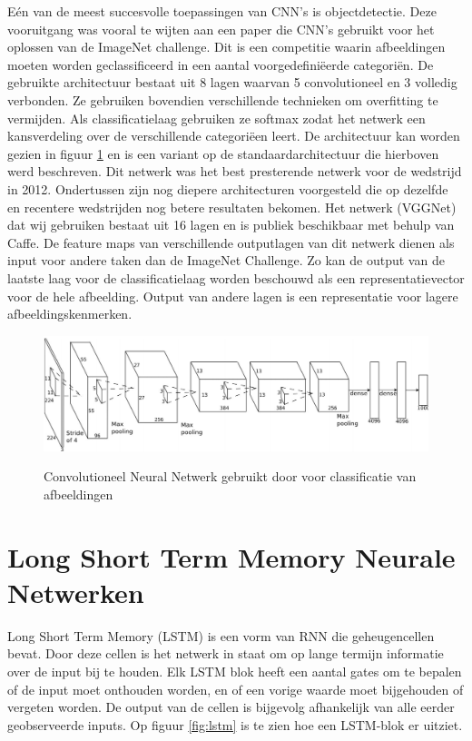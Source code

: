 E\'en van de meest succesvolle toepassingen van CNN's is objectdetectie. Deze vooruitgang was vooral te wijten aan een paper\cite{Krizhevsky2012a} die CNN's gebruikt voor het oplossen van de ImageNet challenge.\cite{ILSVRC15}
Dit is een competitie waarin afbeeldingen moeten worden geclassificeerd in een aantal voorgedefini\"eerde categori\"en. De gebruikte architectuur bestaat uit 8 lagen waarvan 5 convolutioneel en 3 volledig verbonden. Ze gebruiken bovendien verschillende technieken om overfitting te vermijden. Als classificatielaag gebruiken ze softmax zodat het netwerk een kansverdeling over de verschillende categori\"een leert. De architectuur kan worden gezien in figuur \ref{fig:AlexNet} en  is een variant op de standaardarchitectuur die hierboven werd beschreven. Dit netwerk was het best presterende netwerk voor de wedstrijd in 2012. Ondertussen zijn nog diepere architecturen voorgesteld die op dezelfde en recentere wedstrijden nog betere resultaten bekomen. Het netwerk (VGGNet)\cite{Arge2015} dat wij gebruiken bestaat uit 16 lagen en is publiek beschikbaar met behulp van Caffe\cite{Jia2014}. De feature maps van verschillende outputlagen van dit netwerk dienen als input voor andere taken dan de ImageNet Challenge. Zo kan de output van de laatste laag voor de classificatielaag worden beschouwd als een representatievector voor de hele afbeelding. Output van andere lagen is een representatie voor lagere  afbeeldingskenmerken. 
\begin{figure}[tb]
	\centering
	\includegraphics[width=\linewidth]{Images/cnn.PNG}
	\label{fig:AlexNet}
	\caption{Convolutioneel Neural Netwerk gebruikt door \cite{Krizhevsky2012a} voor classificatie van afbeeldingen}
\end{figure}


\section{Long Short Term Memory Neurale Netwerken}
Long Short Term Memory (LSTM) is een vorm van RNN die geheugencellen bevat. Door deze cellen is het netwerk in staat om op lange termijn informatie over de input bij te houden. Elk LSTM blok heeft een aantal gates om te bepalen of de input moet onthouden worden, en of een vorige waarde moet bijgehouden of vergeten worden. De output van de cellen is bijgevolg afhankelijk van alle eerder geobserveerde inputs. Op figuur \ref{fig:lstm} is te zien hoe een LSTM-blok er uitziet.\cite{Google}\cite{SeppHochreiter1997}

